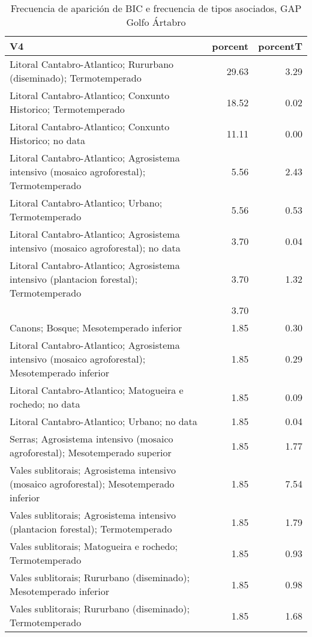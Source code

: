 \begin{table}[p]
\centering
\caption{Frecuencia de aparición de BIC e frecuencia de tipos asociados, GAP Golfo Ártabro} 
\label{vbic1}
\begin{tabular}{lrr}
  \hline
V4 & porcent & porcentT \\ 
  \hline
Litoral Cantabro-Atlantico; Rururbano (diseminado); Termotemperado & 29.63 & 3.29 \\ 
  Litoral Cantabro-Atlantico; Conxunto Historico; Termotemperado & 18.52 & 0.02 \\ 
  Litoral Cantabro-Atlantico; Conxunto Historico; no data & 11.11 & 0.00 \\ 
  Litoral Cantabro-Atlantico; Agrosistema intensivo (mosaico agroforestal); Termotemperado & 5.56 & 2.43 \\ 
  Litoral Cantabro-Atlantico; Urbano; Termotemperado & 5.56 & 0.53 \\ 
  Litoral Cantabro-Atlantico; Agrosistema intensivo (mosaico agroforestal); no data & 3.70 & 0.04 \\ 
  Litoral Cantabro-Atlantico; Agrosistema intensivo (plantacion forestal); Termotemperado & 3.70 & 1.32 \\ 
   & 3.70 &  \\ 
  Canons; Bosque; Mesotemperado inferior & 1.85 & 0.30 \\ 
  Litoral Cantabro-Atlantico; Agrosistema intensivo (mosaico agroforestal); Mesotemperado inferior & 1.85 & 0.29 \\ 
  Litoral Cantabro-Atlantico; Matogueira e rochedo; no data & 1.85 & 0.09 \\ 
  Litoral Cantabro-Atlantico; Urbano; no data & 1.85 & 0.04 \\ 
  Serras; Agrosistema intensivo (mosaico agroforestal); Mesotemperado superior & 1.85 & 1.77 \\ 
  Vales sublitorais; Agrosistema intensivo (mosaico agroforestal); Mesotemperado inferior & 1.85 & 7.54 \\ 
  Vales sublitorais; Agrosistema intensivo (plantacion forestal); Termotemperado & 1.85 & 1.79 \\ 
  Vales sublitorais; Matogueira e rochedo; Termotemperado & 1.85 & 0.93 \\ 
  Vales sublitorais; Rururbano (diseminado); Mesotemperado inferior & 1.85 & 0.98 \\ 
  Vales sublitorais; Rururbano (diseminado); Termotemperado & 1.85 & 1.68 \\ 
   \hline
\end{tabular}
\end{table}

